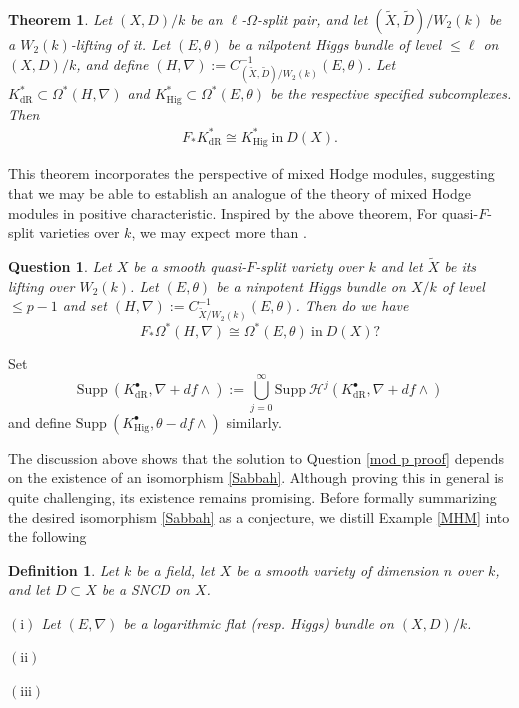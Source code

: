 \documentclass[12pt, a4paper]{article}
\newtheorem{definition}{Definition}[section]
\newtheorem{question}{Question}[section]
\newtheorem{theorem}{Theorem}[section]
\begin{document}
\begin{theorem}\label{de Rham-Higgs without truncation}
Let $(X,D)/k$ be an $\ell$-$\Omega$-split pair, and let $(\tilde X,\tilde D)/W_2(k)$ be a $W_2(k)$-lifting of it. Let $(E,\theta)$ be a nilpotent Higgs bundle of level $\leq \ell$ on $(X,D)/k$, and define $(H,\nabla) := C^{-1}_{(\tilde X,\tilde D)/W_2(k)}(E,\theta)$. Let $K^*_{\mathrm{dR}} \subset \Omega^*(H,\nabla)$ and $K^*_{\mathrm{Hig}} \subset \Omega^*(E,\theta)$ be the respective specified subcomplexes.
 Then
\begin{eqnarray}\label{decom without truncation f=0}
F_*K^*_{\mathrm{dR}}\cong K^*_{\mathrm{Hig}}~\mathrm{in}~D(X).
\end{eqnarray}
\end{theorem}
This theorem incorporates the perspective of mixed Hodge modules, suggesting that we may be able to establish an analogue of the theory of mixed Hodge modules in positive characteristic. Inspired by the above theorem, For quasi-$F$-split varieties over $k$, we may expect more than \cite{P2}.
\begin{question}
Let $X$ be a smooth quasi-$F$-split variety over $k$ and let $\tilde X$ be its lifting over $W_2(k)$. Let $(E,\theta)$ be a ninpotent Higgs bundle on $X/k$ of level $\leq p-1$ and set $(H,\nabla):=C^{-1}_{\tilde X/W_2(k)}(E,\theta)$. Then do we have
$$
F_*\Omega^*(H,\nabla)\cong\Omega^*(E,\theta)~\mathrm{in}~D(X)?
$$
\end{question}


\iffalse
Set 
$$
\mathrm{Supp}~(K^\bullet_\mathrm{dR},\nabla+df\wedge):=\bigcup_{j=0}^\infty\mathrm{Supp}~\mathcal H^j(K^\bullet_\mathrm{dR},\nabla+df\wedge)
$$
and define $\mathrm{Supp}~(K^\bullet_\mathrm{Hig},\theta-df\wedge)$ similarly.




The discussion above shows that the solution to Question \ref{mod p proof} depends on the existence of an isomorphism \eqref{Sabbah}. Although proving this in general is quite challenging, its existence remains promising. Before formally summarizing the desired isomorphism \eqref{Sabbah} as a conjecture, we distill Example \ref{MHM} into the following
\begin{definition}\label{three type MHM}
 Let $k$ be a field, let $X$ be a smooth variety of dimension $n$ over $k$, and let $D\subset X$ be a SNCD on $X$. 
 
 $\mathrm{(i)}$ Let $(E,\nabla)$ be a logarithmic flat (resp. Higgs) bundle on $(X,D)/k$.

 $\mathrm{(ii)}$ 

$\mathrm{(iii)}$ 
\end{definition}
\end{document}
